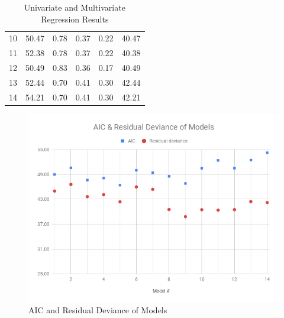 \documentclass[11pt]{article}
\begin{document}
\begin{table}[htbp]
\begin{tabular}{@{}cccccc@{}}
10                & 50.47        & 0.78              & 0.37          & 0.22                    & 40.47                      \\
11                & 52.38        & 0.78              & 0.37          & 0.22                    & 40.38                      \\
12                & 50.49        & 0.83              & 0.36          & 0.17                    & 40.49                      \\
13                & 52.44        & 0.70              & 0.41          & 0.30                    & 42.44                      \\
14                & 54.21        & 0.70              & 0.41          & 0.30                    & 42.21                      \\ \bottomrule
\end{tabular}
\caption{Univariate and Multivariate Regression Results}
\label{table:RegressionResults}
\end{table}

\begin{figure}[htbp]
\centering
\includegraphics[scale=0.5]{AIC-ResidualDeviance.png}
\caption{AIC and Residual Deviance of Models}
\label{fig:AICPlot}
\end{figure}
\end{document}
